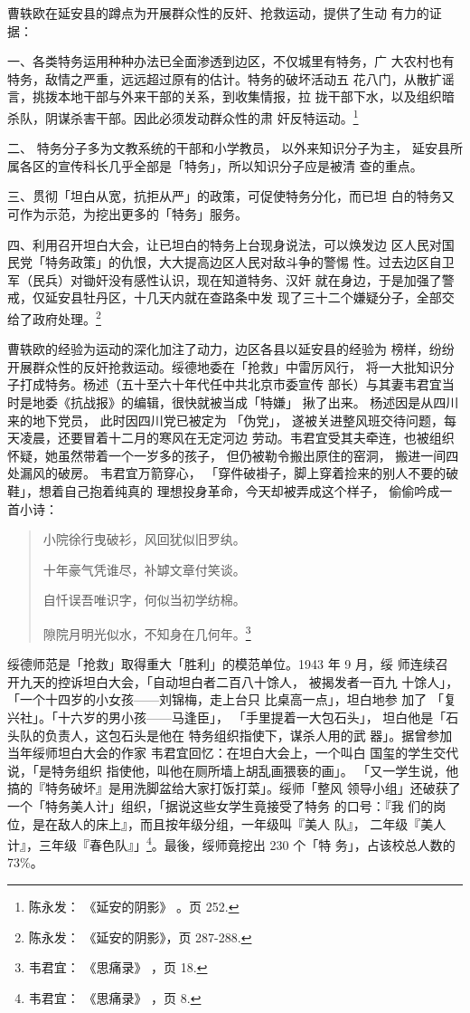 曹轶欧在延安县的蹲点为开展群众性的反奸、抢救运动，提供了生动
有力的证据：

一、各类特务运用种种办法已全面渗透到边区，不仅城里有特务，广
大农村也有特务，敌情之严重，远远超过原有的估计。特务的破坏活动五
花八门，从散扩谣言，挑拨本地干部与外来干部的关系，到收集情报，拉
拢干部下水，以及组织暗杀队，阴谋杀害干部。因此必须发动群众性的肃
奸反特运动。\footnote{陈永发：
《延安的阴影》
。页 252.} 

 
二、
特务分子多为文教系统的干部和小学教员，
以外来知识分子为主，
延安县所属各区的宣传科长几乎全部是「特务」，所以知识分子应是被清
查的重点。

三、贯彻「坦白从宽，抗拒从严」的政策，可促使特务分化，而已坦
白的特务又可作为示范，为挖出更多的「特务」服务。

四、利用召开坦白大会，让已坦白的特务上台现身说法，可以焕发边 区人民对国
民党「特务政策」的仇恨，大大提高边区人民对敌斗争的警惕 性。过去边区自卫
军（民兵）对锄奸没有感性认识，现在知道特务、汉奸 就在身边，于是加强了警
戒，仅延安县牡丹区，十几天内就在查路条中发 现了三十二个嫌疑分子，全部交
给了政府处理。\footnote{陈永发： 《延安的阴影》，页 287-288.} 

曹轶欧的经验为运动的深化加注了动力，边区各县以延安县的经验为
榜样，纷纷开展群众性的反奸抢救运动。绥德地委在「抢救」中雷厉风行，
将一大批知识分子打成特务。杨述（五十至六十年代任中共北京市委宣传
部长）与其妻韦君宜当时是地委《抗战报》的编辑，很快就被当成「特嫌」
揪了出来。
杨述因是从四川来的地下党员，
此时因四川党已被定为
「伪党」，
遂被关进整风班交待问题，每天凌晨，还要冒着十二月的寒风在无定河边
劳动。韦君宜受其夫牵连，也被组织怀疑，她虽然带着一个一岁多的孩子，
但仍被勒令搬出原住的窑洞，
搬进一间四处漏风的破房。
韦君宜万箭穿心，
「穿件破褂子，脚上穿着捡来的别人不要的破鞋」，想着自己抱着纯真的
理想投身革命，今天却被弄成这个样子，
偷偷吟成一首小诗：
\begin{quote}
	\fzwkai 小院徐行曳破衫，风回犹似旧罗纨。

十年豪气凭谁尽，补罅文章付笑谈。

自忏误吾唯识字，何似当初学纺棉。

隙院月明光似水，不知身在几何年。\footnote{韦君宜：
《思痛录》
，页 18.} 
\end{quote}

绥德师范是「抢救」取得重大「胜利」的模范单位。1943 年 9 月，绥 师连续召
开九天的控诉坦白大会，「自动坦白者二百八十馀人， 被揭发者一百九
十馀人」，「一个十四岁的小女孩——刘锦梅，走上台只 比桌高一点」，坦白地参
加了 「复兴社」。「十六岁的男小孩——马逢臣」， 「手里提着一大包石头」，
坦白他是「石头队的负责人，这包石头是他在 特务组织指使下，谋杀人用的武
器」。据曾参加当年绥师坦白大会的作家 韦君宜回忆：在坦白大会上，一个叫白
国玺的学生交代说，「是特务组织 指使他，叫他在厕所墙上胡乱画猥亵的画」。
「又一学生说，他搞的『特务破坏』是用洗脚盆给大家打饭打菜」。绥师「整风
领导小组」还破获了 一个「特务美人计」组织，「据说这些女学生竟接受了特务
的口号：『我 们的岗位，是在敌人的床上』，而且按年级分组，一年级叫『美人
队』， 二年级『美人计』，三年级『春色队』」\footnote{韦君宜： 《思痛录》
，页 8.}。最後，绥师竟挖出 230 个「特 务」，占该校总人数的 73\%。

